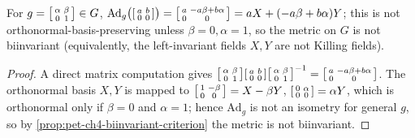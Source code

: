 \begin{proposition}
  \label{prop:pet-ch4-hyperbolic-lie-group-not-biinvariant}
  For $g=\begin{bsmallmatrix}\alpha&\beta\\0&1\end{bsmallmatrix}\in G$,
  $\mathrm{Ad}_g\big(\begin{bsmallmatrix}a&b\\0&0\end{bsmallmatrix}\big)
  =\begin{bsmallmatrix}a&-a\beta+b\alpha\\0&0\end{bsmallmatrix}=aX+(-a\beta+b\alpha)Y$;
  this is not orthonormal-basis-preserving unless $\beta=0,\alpha=1$, so the
  metric on $G$ is not biinvariant (equivalently, the left-invariant fields
  $X,Y$ are not Killing fields).
\end{proposition}
\begin{proof}
  A direct matrix computation gives
  $\begin{bsmallmatrix}\alpha&\beta\\0&1\end{bsmallmatrix}
  \begin{bsmallmatrix}a&b\\0&0\end{bsmallmatrix}
  \begin{bsmallmatrix}\alpha&\beta\\0&1\end{bsmallmatrix}^{-1}
  =\begin{bsmallmatrix}a&-a\beta+b\alpha\\0&0\end{bsmallmatrix}$.
  The orthonormal basis $X,Y$ is mapped to
  $\begin{bsmallmatrix}1&-\beta\\0&0\end{bsmallmatrix}=X-\beta Y$,
  $\begin{bsmallmatrix}0&\alpha\\0&0\end{bsmallmatrix}=\alpha Y$, which is
  orthonormal only if $\beta=0$ and $\alpha=1$; hence $\mathrm{Ad}_g$ is not
  an isometry for general $g$, so by
  \cref{prop:pet-ch4-biinvariant-criterion} the metric is not biinvariant.
\end{proof}

